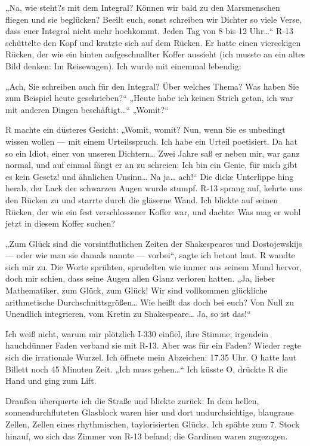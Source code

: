 „Na, wie steht?s mit dem Integral? Können wir bald zu den
Marsmenschen fliegen und sie beglücken? Beeilt euch, sonst
schreiben wir Dichter so viele Verse, dass euer Integral nicht mehr
hochkommt. Jeden Tag von 8 bis 12 Uhr\ldots{}“ R-13 schüttelte den Kopf
und kratzte sich auf dem Rücken. Er hatte einen viereckigen Rücken,
der wie ein hinten aufgeschnallter Koffer aussieht (ich musste an
ein altes Bild denken: Im Reisewagen). Ich wurde mit einemmal
lebendig:

„Ach, Sie schreiben auch für den Integral? Über welches Thema? Was
haben Sie zum Beispiel heute geschrieben?“ „Heute habe ich keinen
Strich getan, ich war mit anderen Dingen beschäftigt\ldots{}“ „Womit?“

R machte ein düsteres Gesicht: „Womit, womit? Nun, wenn Sie es
unbedingt wissen wollen — mit einem Urteilsspruch. Ich habe ein
Urteil poetisiert. Da hat so ein Idiot, einer von unseren
Dichtern\ldots{} Zwei Jahre saß er neben mir, war ganz normal, und auf
einmal fängt er an zu schreien: \glq{}Ich bin ein Genie,
für mich gibt es kein Gesetz!\grq{} und ähnlichen Unsinn\ldots{} Na
ja\ldots{} ach!“ Die dicke Unterlippe hing herab, der Lack der schwarzen
Augen wurde stumpf. R-13 sprang auf, kehrte uns den Rücken zu und
starrte durch die gläserne Wand. Ich blickte auf seinen Rücken, der
wie ein fest verschlossener Koffer war, und dachte: Was mag er wohl
jetzt in diesem Koffer suchen?

„Zum Glück sind die vorsintflutlichen Zeiten der Shakespeares und
Dostojewskijs — oder wie man sie damals nannte — vorbei“, sagte ich
betont laut. R wandte sich mir zu. Die Worte sprühten, sprudelten
wie immer aus seinem Mund hervor, doch mir schien, dass seine Augen
allen Glanz verloren hatten. „Ja, lieber Mathematiker, zum Glück,
zum Glück! Wir sind vollkommen glückliche arithmetische
Durchschnittsgrößen\ldots{} Wie heißt das doch bei euch? Von Null zu
Unendlich integrieren, vom Kretin zu Shakespeare\ldots{} Ja, so ist
das!“

Ich weiß nicht, warum mir plötzlich I-330 einfiel, ihre Stimme;
irgendein hauchdünner Faden verband sie mit R-13. Aber was für ein
Faden? Wieder regte sich die irrationale Wurzel. Ich öffnete mein
Abzeichen: 17.35 Uhr. O hatte laut Billett noch 45 Minuten Zeit.
„Ich muss gehen\ldots{}“ Ich küsste O, drückte R die Hand und ging zum
Lift.

Draußen überquerte ich die Straße und blickte zurück: In dem
hellen, sonnendurchfluteten Glasblock waren hier und dort
undurchsichtige, blaugraue Zellen, Zellen eines rhythmischen,
taylorisierten Glücks. Ich spähte zum 7. Stock hinauf, wo sich das
Zimmer von R-13 befand; die Gardinen waren zugezogen.

